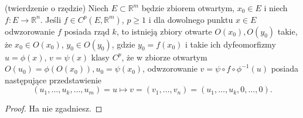 \documentclass[leqno]{article}
\begin{document}
\begin{justify}
\begin{theorem}
{
    (twierdzenie o rzędzie) Niech $E \subset \mathbb{R}^m$ będzie zbiorem otwartym, $x_0 \in E$ i niech $f : E \to \mathbb{R}^n$. Jeśli 
    $f \in C^p(E, \mathbb{R}^m)$, $p \geqslant 1$ i dla dowolnego punktu $x \in E$ odwzorowanie $f$ posiada rząd $k$, to istnieją zbiory otwarte $O(x_0), O(y_0)$ takie, że $x_0 \in O(x_0)$, $y_0 \in O(y_0)$, gdzie $y_0 = f(x_0)$ i takie ich dyfeomorfizmy $u = \phi(x)$, $v = \psi(x)$ klasy $C^p$, że w zbiorze otwartym 
    $O(u_0) = \phi(O(x_0)), u_0 = \psi(x_0)$, odwzorowanie $v = \psi \circ f \circ \phi^{-1}(u)$ posiada następujące przedstawienie 
    \setcounter{equation}{153}
    \begin{equation}\label{eq:154}
        (u_1, \ldots, u_k, \ldots, u_m) = u \mapsto v = (v_1, \ldots, v_n) = (u_1, \ldots, u_k, 0, \ldots, 0).
    \end{equation}
}
\end{theorem}
\begin{proof}
    Ha nie zgadniesz. 
\end{proof}


\end{justify}
\end{document}
